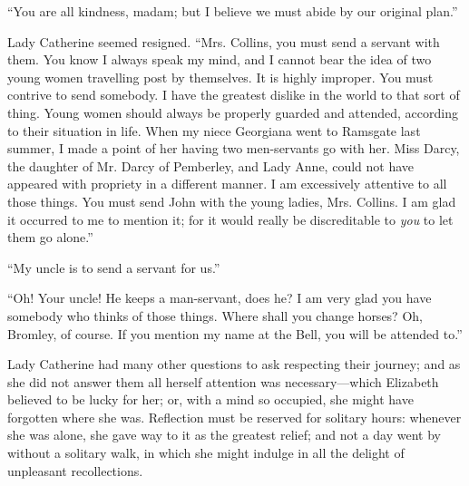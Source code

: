 \documentclass[12pt]{book}
\begin{document}
``You are all kindness, madam; but I believe we must abide by our original plan.''

Lady Catherine seemed resigned. ``Mrs. Collins, you must send a servant with them. You know I always speak my mind, and I cannot bear the idea of two young women travelling post by themselves. It is highly improper. You must contrive to send somebody. I have the greatest dislike in the world to that sort of thing. Young women should always be properly guarded and attended, according to their situation in life. When my niece Georgiana went to Ramsgate last summer, I made a point of her having two men-servants go with her. Miss Darcy, the daughter of Mr. Darcy of Pemberley, and Lady Anne, could not have appeared with propriety in a different manner. I am excessively attentive to all those things. You must send John with the young ladies, Mrs. Collins. I am glad it occurred to me to mention it; for it would really be discreditable to \textit{you} to let them go alone.''

``My uncle is to send a servant for us.''

``Oh! Your uncle! He keeps a man-servant, does he? I am very glad you have somebody who thinks of those things. Where shall you change horses? Oh, Bromley, of course. If you mention my name at the Bell, you will be attended to.''

Lady Catherine had many other questions to ask respecting their journey; and as she did not answer them all herself attention was necessary---which Elizabeth believed to be lucky for her; or, with a mind so occupied, she might have forgotten where she was. Reflection must be reserved for solitary hours: whenever she was alone, she gave way to it as the greatest relief; and not a day went by without a solitary walk, in which she might indulge in all the delight of unpleasant recollections.
\end{document}
